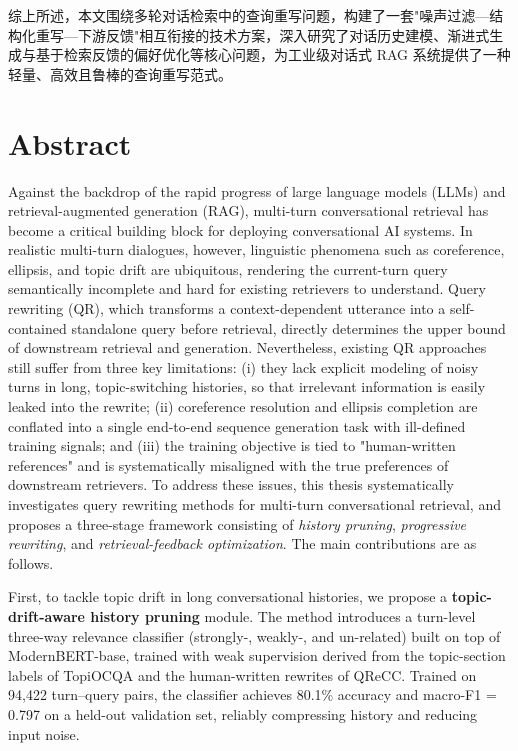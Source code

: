综上所述，本文围绕多轮对话检索中的查询重写问题，构建了一套"噪声过滤—结构化重写—下游反馈"相互衔接的技术方案，深入研究了对话历史建模、渐进式生成与基于检索反馈的偏好优化等核心问题，为工业级对话式 RAG 系统提供了一种轻量、高效且鲁棒的查询重写范式。


\chapter{Abstract}

Against the backdrop of the rapid progress of large language models (LLMs) and retrieval-augmented generation (RAG), multi-turn conversational retrieval has become a critical building block for deploying conversational AI systems. In realistic multi-turn dialogues, however, linguistic phenomena such as coreference, ellipsis, and topic drift are ubiquitous, rendering the current-turn query semantically incomplete and hard for existing retrievers to understand. Query rewriting (QR), which transforms a context-dependent utterance into a self-contained standalone query before retrieval, directly determines the upper bound of downstream retrieval and generation. Nevertheless, existing QR approaches still suffer from three key limitations: (i) they lack explicit modeling of noisy turns in long, topic-switching histories, so that irrelevant information is easily leaked into the rewrite; (ii) coreference resolution and ellipsis completion are conflated into a single end-to-end sequence generation task with ill-defined training signals; and (iii) the training objective is tied to "human-written references" and is systematically misaligned with the true preferences of downstream retrievers. To address these issues, this thesis systematically investigates query rewriting methods for multi-turn conversational retrieval, and proposes a three-stage framework consisting of \emph{history pruning}, \emph{progressive rewriting}, and \emph{retrieval-feedback optimization}. The main contributions are as follows.

First, to tackle topic drift in long conversational histories, we propose a \textbf{topic-drift-aware history pruning} module. The method introduces a turn-level three-way relevance classifier (strongly-, weakly-, and un-related) built on top of ModernBERT-base, trained with weak supervision derived from the topic-section labels of TopiOCQA and the human-written rewrites of QReCC. Trained on 94{,}422 turn--query pairs, the classifier achieves 80.1\% accuracy and macro-F1 = 0.797 on a held-out validation set, reliably compressing history and reducing input noise.

